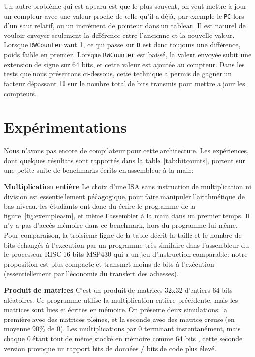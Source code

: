 \documentclass[architecture]{compas2018}
\begin{document}
Un autre problème qui est apparu est que le plus souvent, on veut  mettre à jour un compteur avec une valeur proche de celle qu'il a déjà, par exemple le \texttt{PC} lors d'un saut relatif, ou un incrément de pointeur dans un tableau.
Il est naturel de vouloir envoyer seulement la différence entre l'ancienne et la nouvelle valeur.
Lorsque \texttt{RWCounter} vaut 1, ce qui passe sur \texttt{D} est donc toujours une différence, poids faible en premier.
Lorsque \texttt{RWCounter} est baissé, la valeur envoyée subit une extension de signe sur 64 bits, et cette valeur est ajoutée au compteur.
Dans les tests que nous présentons ci-dessous, cette technique a permis de gagner un facteur dépassant 10  sur le nombre total de bits transmis pour mettre a jour les compteurs.




\section{Expérimentations}
Nous n'avons pas encore de compilateur pour cette architecture.
Les expériences, dont quelques résultats sont rapportés dans la table~\ref{tab:bitcounts}, portent sur une petite suite de benchmarks écrits en assembleur à la main:

\textbf{Multiplication entière} Le choix d'une ISA sans instruction de multiplication ni division est essentiellement pédagogique, pour faire manipuler l'arithmétique de bas niveau.
les étudiants ont donc du écrire le programme de la figure~\ref{fig:exempleasm}, et même l'assembler à la main dans un premier temps.
Il n'y a pas d'accès mémoire dans ce benchmark, hors du programme lui-même.
Pour comparaison, la troisième ligne de la table décrit la taille et le nombre de bits échangés à l'exécution par un programme très similaire dans l'assembleur du le processeur RISC 16 bits MSP430 qui a un jeu d'instruction comparable: notre proposition est plus compacte et transmet moins de bits à l'exécution (essentiellement par l'économie du transfert des adresses).




\textbf{Produit de matrices}
C'est un produit de matrices 32x32 d'entiers 64 bits aléatoires.
Ce programme utilise la multiplication entière précédente, mais les matrices sont lues et écrites en mémoire.
On présente deux simulations: la première avec des matrices pleines, et la seconde avec des matrice creuse (en moyenne 90\% de 0).
Les multiplications par 0 terminant instantanément, mais chaque 0 étant tout de même stocké en mémoire comme 64 bits%
, cette seconde version provoque un rapport bits de données / bits de code plus élevé.
\end{document}
